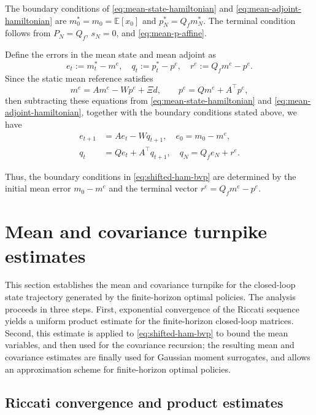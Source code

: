 \documentclass[10pt,journal,twoside]{IEEEtran}
\theoremstyle{definition}
\theoremstyle{remark}
\begin{document}
The boundary conditions of \eqref{eq:mean-state-hamiltonian} and \eqref{eq:mean-adjoint-hamiltonian}  are \(m_0^*=m_0=\mathbb E[x_0]\) and \(p_N^*=Q_fm_N^*\). The terminal condition follows from \(P_N=Q_f\), \(s_N=0\), and \eqref{eq:mean-p-affine}.

Define the errors in the mean state and mean adjoint as
\begin{equation}
	e_t:=m_t^*-m^e,
	\quad
	q_t:=p_t^*-p^e,
	\quad
	r^e:=Q_fm^e-p^e .
	\label{eq:shifted-vars}
\end{equation}
Since the static  mean reference satisfies
\[
m^e=Am^e-Wp^e+\Xi d,
\qquad
p^e=Qm^e+A^\top p^e,
\]
then subtracting these equations from \eqref{eq:mean-state-hamiltonian} and \eqref{eq:mean-adjoint-hamiltonian}, together with the boundary conditions stated above, we have
\begin{equation}
	\begin{aligned}
		e_{t+1}
		&=
		Ae_t
		-Wq_{t+1}, \quad e_0
		=
		m_0-m^e,\\
		q_t
		&=
		Qe_t
		+
		A^\top q_{t+1},\quad
		q_N
		=
		Q_fe_N+r^e .
	\end{aligned}
	\label{eq:shifted-ham-bvp}
\end{equation}


Thus, the boundary conditions in \eqref{eq:shifted-ham-bvp} are determined by the initial mean error \(m_0-m^e\) and the terminal vector \(r^e=Q_fm^e-p^e\).



\section{Mean and covariance turnpike estimates}
\label{sec:turnpike}

This section establishes the mean and covariance turnpike for the closed-loop state trajectory generated by the finite-horizon optimal policies.
The analysis proceeds in three steps.  First, exponential convergence of the Riccati sequence yields a uniform product estimate for the  finite-horizon closed-loop matrices.  Second, this estimate is applied to \eqref{eq:shifted-ham-bvp} to bound the mean variables, and then used for the covariance recursion; the resulting mean and covariance estimates are finally  used for Gaussian moment surrogates, and allows an approximation scheme for finite-horizon optimal policies.

\subsection{Riccati convergence and product estimates}
\label{subsec:riccati-tail-product}
\end{document}
